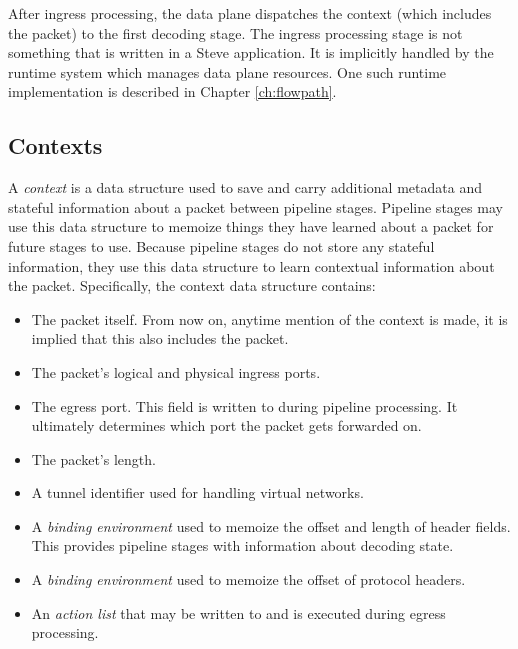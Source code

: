 After ingress processing, the data plane dispatches the context (which includes
the packet) to the first decoding stage. The ingress processing stage is not
something that is written in a Steve application. It is implicitly handled by
the runtime system which manages data plane resources. One such runtime implementation is described in Chapter
\ref{ch:flowpath}.

\subsection{Contexts} \label{context_desc}

A \emph{context} is a data structure used to save and carry
additional metadata and stateful information about a packet between pipeline stages.
Pipeline stages may use this data structure to memoize things they have learned
about a packet for future stages to use.
Because pipeline stages do not store any stateful information, they use this data structure to learn contextual information about the packet.
Specifically, the context data structure contains:

\begin{itemize} 
\item The packet itself. From now on, anytime mention of the
context is made, it is implied that this also includes the packet. 

\item
The packet's logical and physical ingress ports. 

\item The egress port. This
field is written to during pipeline processing. It ultimately determines which
port the packet gets forwarded on. 

\item The packet's length. 

\item A tunnel identifier used for handling virtual networks.

\item A \emph{binding environment} used to memoize the offset
and length of header fields. This provides pipeline stages with
information about decoding state.

\item A \emph{binding environment} used to memoize the offset
of protocol headers. 

\item An \emph{action list} that may be written to and is
executed during egress processing. 
\end{itemize}

